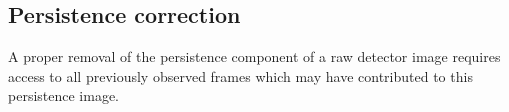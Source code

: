 \subsection{Persistence correction}

A proper removal of the persistence component of a raw detector image requires access to all previously observed frames which may have contributed to this persistence image.